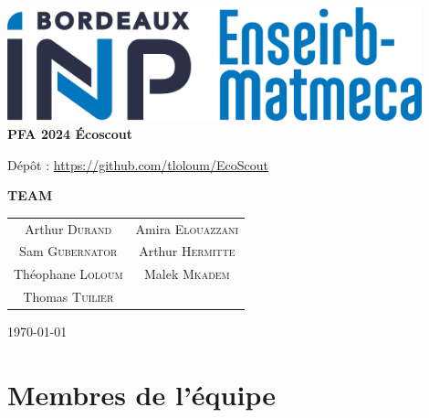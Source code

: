 

    \begin{center}
        \vspace*{\fill}

        \includegraphics[width=0.9\textwidth]{pictures/logoEnseirbMatmeca.jpg}~\\[3cm]
        
        {\Huge \bfseries PFA 2024 Écoscout\\[1cm]}

        {\LARGE Dépôt : \url{https://github.com/tloloum/EcoScout}\\[1cm]}

        {\textbf{TEAM}\\}
        \begin{table}[h]
            \centering
            \begin{tabular}{cc}

                Arthur \textsc{Durand} & Amira \textsc{Elouazzani} \\
                Sam \textsc{Gubernator} & Arthur \textsc{Hermitte} \\
                Théophane \textsc{Loloum} & Malek \textsc{Mkadem} \\ 
                                    Thomas \textsc{Tuilier}

            \end{tabular}
        \end{table}

        
        \vspace*{\fill}
        
        \large \today
    \end{center}


\newpage

\tableofcontents

\vspace{20px}

\section*{Membres de l'équipe}

